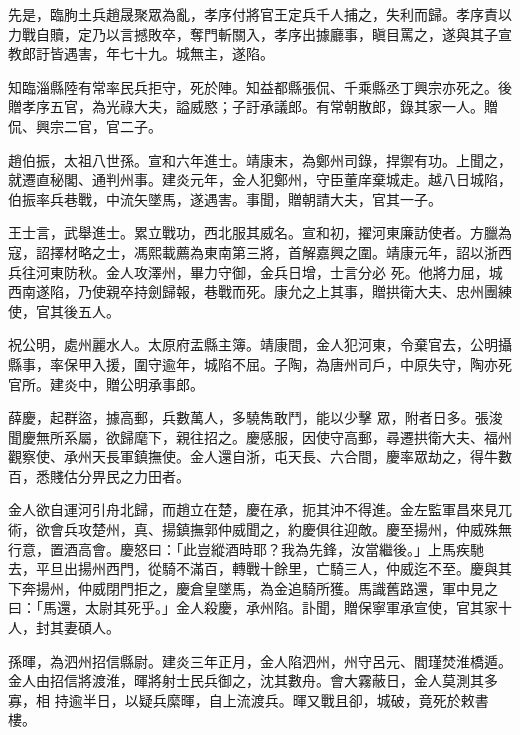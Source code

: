 \begin{pinyinscope}
 先是，臨朐土兵趙晟聚眾為亂，孝序付將官王定兵千人捕之，失利而歸。孝序責以力戰自贖，定乃以言撼敗卒，奪門斬關入，孝序出據廳事，瞋目罵之，遂與其子宣教郎訏皆遇害，年七十九。城無主，遂陷。



 知臨淄縣陸有常率民兵拒守，死於陣。知益都縣張侃、千乘縣丞丁興宗亦死之。後贈孝序五官，為光祿大夫，謚威愍；子訏承議郎。有常朝散郎，錄其家一人。贈侃、興宗二官，官二子。



 趙伯振，太祖八世孫。宣和六年進士。靖康末，為鄭州司錄，捍禦有功。上聞之，就遷直秘閣、通判州事。建炎元年，金人犯鄭州，守臣董庠棄城走。越八日城陷，伯振率兵巷戰，中流矢墜馬，遂遇害。事聞，贈朝請大夫，官其一子。



 王士言，武舉進士。累立戰功，西北服其威名。宣和初，擢河東廉訪使者。方臘為寇，詔擇材略之士，馮熙載薦為東南第三將，首解嘉興之圍。靖康元年，詔以浙西兵往河東防秋。金人攻澤州，畢力守御，金兵日增，士言分必
 死。他將力屈，城西南遂陷，乃使親卒持劍歸報，巷戰而死。康允之上其事，贈拱衛大夫、忠州團練使，官其後五人。



 祝公明，處州麗水人。太原府盂縣主簿。靖康間，金人犯河東，令棄官去，公明攝縣事，率保甲入援，圍守逾年，城陷不屈。子陶，為唐州司戶，中原失守，陶亦死官所。建炎中，贈公明承事郎。



 薛慶，起群盜，據高郵，兵數萬人，多驍雋敢鬥，能以少擊
 眾，附者日多。張浚聞慶無所系屬，欲歸麾下，親往招之。慶感服，因使守高郵，尋遷拱衛大夫、福州觀察使、承州天長軍鎮撫使。金人還自浙，屯天長、六合間，慶率眾劫之，得牛數百，悉賤估分畀民之力田者。



 金人欲自運河引舟北歸，而趙立在楚，慶在承，扼其沖不得進。金左監軍昌來見兀術，欲會兵攻楚州，真、揚鎮撫郭仲威聞之，約慶俱往迎敵。慶至揚州，仲威殊無行意，置酒高會。慶怒曰：「此豈縱酒時耶？我為先鋒，汝當繼後。」上馬疾馳
 去，平旦出揚州西門，從騎不滿百，轉戰十餘里，亡騎三人，仲威迄不至。慶與其下奔揚州，仲威閉門拒之，慶倉皇墜馬，為金追騎所獲。馬識舊路還，軍中見之曰：「馬還，太尉其死乎。」金人殺慶，承州陷。訃聞，贈保寧軍承宣使，官其家十人，封其妻碩人。



 孫暉，為泗州招信縣尉。建炎三年正月，金人陷泗州，州守呂元、閻瑾焚淮橋遁。金人由招信將渡淮，暉將射士民兵御之，沈其數舟。會大霧蔽日，金人莫測其多寡，相
 持逾半日，以疑兵縻暉，自上流渡兵。暉又戰且卻，城破，竟死於敕書樓。




\end{pinyinscope}
